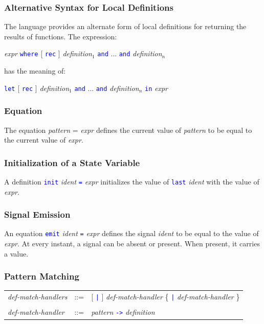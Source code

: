 \documentclass[11pt,titlepage,twoside]{report}
\newcommand{\Let}{\mbox{{\tt let}}}
\newcommand{\Rec}{\mbox{{\tt rec}}}
\newcommand{\In}{\mbox{{\tt in}}}
\newcommand{\AND}{\mbox{{\tt and}}}
\newcommand{\Emit}{\mbox{{\tt emit}}}
\newcommand{\Last}{\mbox{{\tt last}}}
\newcommand{\Minusgreater}{\mbox{{\tt ->}}}
\newcommand{\Where}{\mbox{{\tt where}}}
\newcommand{\term}[1]{\textcolor{Blue}{\tt #1}}
\newcommand{\nterm}[1]{\textcolor{BrickRed}{\it #1}}
\newcommand{\term}[1]{{\tt #1}}
\newcommand{\nterm}[1]{{\em #1}}
\begin{document}
\subsubsection{Alternative Syntax for Local Definitions}

The language provides an alternate form of local definitions for returning
the results of functions. The expression:
\begin{center}
\nterm{expr} \term{\Where} [ \term{\Rec} ]
  \nterm{definition}$_1$ \term{\AND} ... \term{\AND} \nterm{definition}$_n$ 
\end{center}
has the meaning of:
\begin{center}
  \term{\Let} [ \term{\Rec} ] 
  \nterm{definition}$_1$ \term{\AND} ... \term{\AND} \nterm{definition}$_n$
  \term{\In} \nterm{expr}
\end{center}

\subsubsection{Equation}

The equation \nterm{pattern} = \nterm{expr} defines the current
value of \nterm{pattern} to be equal to the current value of \nterm{expr}.

\subsubsection{Initialization of a State Variable}

A definition \term{init} \nterm{ident} \term{=} \nterm{expr} initializes
the value of \term{\Last} \nterm{ident} with the
value of \nterm{expr}.

\subsubsection{Signal Emission}

An equation \term{\Emit} \nterm{ident} \term{=} \nterm{expr} defines
the signal \nterm{ident} to be equal to the value of \nterm{expr}. At
every instant, a signal can be absent or present. When present, it carries
a value.

\subsubsection{Pattern Matching}

\begin{center}
\begin{tabular}{lcl}
\nterm{def-match-handlers}
   & ::=        & [ \term{|} ] \nterm{def-match-handler}
                  \{ \term{|} \nterm{def-match-handler} \} 
\\ \\
\nterm{def-match-handler}
   & ::=        & \nterm{pattern} \term{\Minusgreater} \nterm{definition}
\end{tabular}
\end{center}
\end{document}

